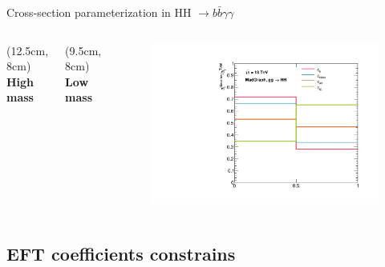\begin{frame}{Cross-section parameterization in HH $\to b\bar{b}\gamma\gamma$}
\begin{columns}
\begin{textblock*}{5cm}(12.5cm, 8cm) %
    \textbf{\textcolor{HHred}{High mass}}
\end{textblock*}
\begin{textblock*}{5cm}(9.5cm, 8cm) %
    \textbf{\textcolor{HHturquoise_d}{Low mass}}
\end{textblock*}
\begin{figure}
    \centering\includegraphics[width=1.\textwidth]{Part5/Img/a_i_total.pdf}
\end{figure}   


\end{columns} 
\end{frame}


\subsection{EFT coefficients constrains}

